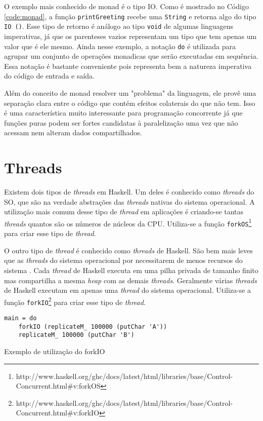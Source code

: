 O exemplo mais conhecido de monad é o tipo IO. Como é mostrado no Código \ref{code:monad}, a função \verb|printGreeting| recebe uma \verb|String| e retorna algo do tipo \verb|IO ()|. Esse tipo de retorno é análogo ao tipo \verb|void| de algumas linguagens imperativas, já que os parenteses vazios representam um tipo que tem apenas um valor que é ele mesmo. Ainda nesse exemplo, a notação \verb|do| é utilizada para agrupar um conjunto de operações monadicas que serão executadas em sequência. Essa notação é bastante conveniente pois  representa bem a natureza imperativa do código de entrada e saída.

Além do conceito de monad resolver um "problema" da linguagem, ele provê uma separação clara entre o código que contém efeitos colaterais do que não tem. Isso é uma característica muito interessante para programação concorrente já que funções puras podem ser fortes candidatas à paralelização uma vez que não acessam nem alteram dados compartilhados.


\section{Threads}

Existem dois tipos de \emph{threads} em Haskell. Um deles é conhecido como \emph{threads} do SO, que são na verdade abstrações das \emph{threads} nativas do sistema operacional. A utilização mais comum desse tipo de \emph{thread} em aplicações é criando-se tantas \emph{threads} quantos são os números de núcleos da CPU. Utiliza-se a função \verb|forkOS|\footnote{http://www.haskell.org/ghc/docs/latest/html/libraries/base/Control-Concurrent.html\#v:forkOS} para criar esse tipo de \emph{thread}.

O outro tipo de \emph{thread} é conhecido como \emph{threads} de Haskell. São bem mais leves que as \emph{threads} do sistema operacional por necessitarem de menos recursos do sistema \cite{marlow2009runtime}. Cada \emph{thread} de Haskell executa em uma pilha privada de tamanho finito mas compartilha a mesma \emph{heap} com as demais \emph{threads}. Geralmente várias \emph{threads} de Haskell executam em apenas uma \emph{thread} do sistema operacional. Utiliza-se a função \verb|forkIO|\footnote{http://www.haskell.org/ghc/docs/latest/html/libraries/base/Control-Concurrent.html\#v:forkIO} para criar esse tipo de \emph{thread}.

\begin{listing}
  \begin{verbatim}
main = do
    forkIO (replicateM_ 100000 (putChar 'A'))
    replicateM_ 100000 (putChar 'B')
  \end{verbatim}
  \caption{Exemplo de utilização do forkIO}
  \label{code:forkio}
\end{listing}


